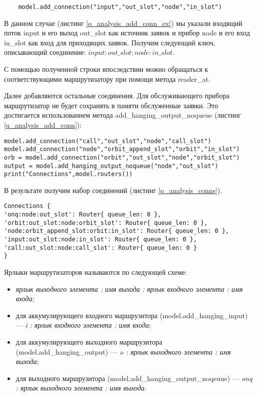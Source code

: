 \begin{lstlisting}
	model.add_connection("input","out_slot","node","in_slot")
\end{lstlisting}
В данном случае (листинг \ref{q_analysis_add_conn_ex}) мы указали входящий поток input и его выход out\_slot как источник заявок и прибор node и его вход in\_slot как вход для приходящих заявок. Получим следующий ключ, описывающий соединение: $input:out\_slot:node:in\_slot$.

С помощью полученной строки впоследствии можно обращаться к соответствующими маршрутизатору при помощи метода reader\_at.

Далее добавляются остальные соединения. Для обслуживающего прибора маршрутизатор не будет сохранять в памяти обслуженные заявки. Это достигается использованием метода add\_hanging\_output\_noqueue (листинг \ref{q_analysis_add_conn}):
\begin{lstlisting}
model.add_connection("call","out_slot","node","call_slot")
model.add_connection("node","orbit_append_slot","orbit","in_slot")
orb = model.add_connection("orbit","out_slot","node","orbit_slot")
output = model.add_hanging_output_noqueue("node","out_slot")
print("Connections",model.routers())
\end{lstlisting}
В результате получим набор соединений (листинг \ref{q_analysis_conns}).
\begin{lstlisting}
Connections {
'onq:node:out_slot': Router{ queue_len: 0 },
'orbit:out_slot:node:orbit_slot': Router{ queue_len: 0 },
'node:orbit_append_slot:orbit:in_slot': Router{ queue_len: 0 },
'input:out_slot:node:in_slot': Router{ queue_len: 0 },
'call:out_slot:node:call_slot': Router{ queue_len: 0 }
}
\end{lstlisting}

Ярлыки маршрутизаторов называются по следующей схеме:
\begin{itemize}
	\item \textit{ ярлык выходного элемента :  имя выхода :  ярлык входного элемента : имя входа};
	\item для аккумулирующего входного маршрузитора (model.add\_hanging\_input) --- \textit{i :  ярлык входного элемента : имя входа};
	\item для аккумулирующего выходного маршрузитора (model.add\_hanging\_output) --- \textit{o :  ярлык выходного элемента : имя выхода};
	\item для выходного маршрузитора (model.add\_hanging\_output\_noqeuue) --- \textit{onq :  ярлык выходного элемента : имя выхода}.
\end{itemize}

